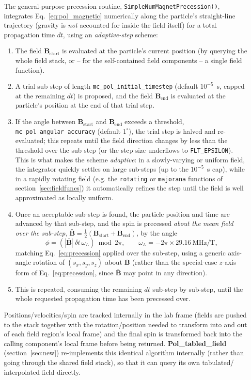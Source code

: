 The general-purpose precession routine, \texttt{SimpleNumMagnetPrecession()},
integrates Eq.~\ref{eq:pol_magnetic} numerically along the particle's
straight-line trajectory (gravity is \emph{not} accounted for inside the
field itself) for a total propagation time $dt$, using an
\emph{adaptive-step} scheme:

\begin{enumerate}
\item The field $\mathbf{B}_\mathrm{start}$ is evaluated at the particle's
  current position (by querying the whole field stack, or -- for the
  self-contained field components -- a single field function).
\item A trial sub-step of length \texttt{mc\_pol\_initial\_timestep}
  (default $10^{-5}$~s, capped at the remaining $dt$) is proposed, and the
  field $\mathbf{B}_\mathrm{end}$ is evaluated at the particle's position at
  the end of that trial step.
\item If the angle between $\mathbf{B}_\mathrm{start}$ and
  $\mathbf{B}_\mathrm{end}$ exceeds a threshold, \texttt{mc\_pol\_angular\_accuracy}
  (default $1^\circ$), the trial step is halved and re-evaluated; this
  repeats until the field direction changes by less than the threshold
  over the sub-step (or the step size underflows to \texttt{FLT\_EPSILON}).
  This is what makes the scheme \emph{adaptive}: in a slowly-varying or
  uniform field, the integrator quickly settles on large sub-steps (up to
  the $10^{-5}$~s cap), while in a rapidly rotating field (e.g. the
  \texttt{rotating} or \texttt{majorana} functions of
  section~\ref{sec:fieldfuncs}) it automatically refines the step until the
  field is well approximated as locally uniform.
\item Once an acceptable sub-step is found, the particle position and time
  are advanced by that sub-step, and the spin is precessed \emph{about the
  mean field over the sub-step}, $\bar{\mathbf{B}} = \tfrac12
  (\mathbf{B}_\mathrm{start}+\mathbf{B}_\mathrm{end})$, by the angle
  \[
    \phi = \left(|\bar{\mathbf{B}}|\, \delta t\, \omega_L\right) \bmod 2\pi,
    \qquad
    \omega_L = -2\pi \times 29.16~\mathrm{MHz/T},
  \]
  matching Eq.~\ref{eq:precession} applied over the sub-step, using a
  generic axis-angle rotation of $(s_x,s_y,s_z)$ about $\bar{\mathbf{B}}$
  (rather than the special-case $z$-axis form of Eq.~\ref{eq:precession},
  since $\bar{\mathbf{B}}$ may point in any direction).
\item This is repeated, consuming the remaining $dt$ sub-step by sub-step,
  until the whole requested propagation time has been precessed over.
\end{enumerate}
Positions/velocities/spin are tracked internally in the lab frame (fields
are pushed to the stack together with the rotation/position needed to
transform into and out of each field region's local frame) and the final
spin is transformed back into the calling component's local frame before
being returned. \textbf{Pol\_tabled\_field} (section~\ref{sec:new})
re-implements this identical algorithm internally (rather than going
through the shared field stack), so that it can query its own tabulated/
interpolated field directly.

